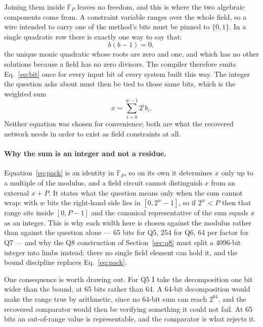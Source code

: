 \documentclass[11pt,a4paper]{article}
\newcommand{\F}{\mathbb F}
\begin{document}
Joining them inside $\F_P$ leaves no freedom, and this is where the two
algebraic components come from. A constraint variable ranges over the whole
field, so a wire intended to carry one of the method's bits must be pinned to
$\{0,1\}$. In a single quadratic row there is exactly one way to say that:
\begin{equation}\label{eq:bit}
b(b-1)=0,
\end{equation}
the unique monic quadratic whose roots are zero and one, and which has no other
solutions because a field has no zero divisors. The compiler therefore emits
Eq.~\eqref{eq:bit} once for every input bit of every system built this way. The
integer the question asks about must then be tied to those same bits, which is
the weighted sum
\begin{equation}\label{eq:pack}
x=\sum_{i=0}^{w-1}2^i b_i .
\end{equation}
Neither equation was chosen for convenience; both are what the recovered
network needs in order to exist as field constraints at all.

\paragraph{Why the sum is an integer and not a residue.} Equation~\eqref{eq:pack}
is an identity in $\F_P$, so on its own it determines $x$ only up to a multiple
of the modulus, and a field circuit cannot distinguish $x$ from an external
$x+P$. It states what the question means only when the sum cannot wrap: with
$w$ bits the right-hand side lies in $[0,2^w-1]$, so if $2^w<P$ then that range
sits inside $[0,P-1]$ and the canonical representative of the sum equals $x$ as
an integer. This is why each width here is chosen against the modulus rather
than against the question alone --- 65 bits for Q5, 254 for Q6, 64 per factor
for Q7 --- and why the Q8 construction of Section~\ref{sec:q8} must split a
4096-bit integer into limbs instead: there no single field element can hold it,
and the bound discipline replaces Eq.~\eqref{eq:pack}.

One consequence is worth drawing out. For Q5 I take the decomposition one bit
wider than the bound, at 65 bits rather than 64. A 64-bit decomposition would
make the range true by arithmetic, since no 64-bit sum can reach $2^{64}$, and
the recovered comparator would then be verifying something it could not fail.
At 65 bits an out-of-range value is representable, and the comparator is what
rejects it.
\end{document}
